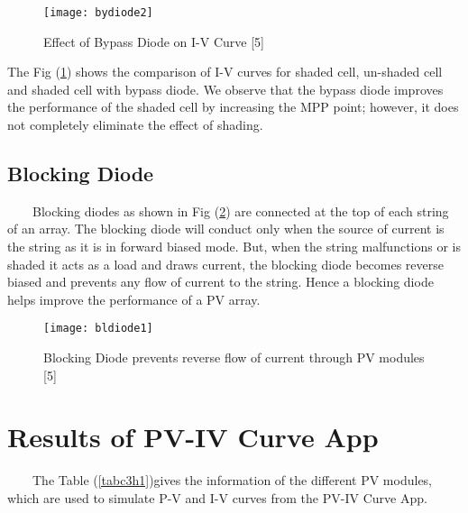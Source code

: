 \begin{figure}[H]
\centering
\texttt{[image: bydiode2]}
\caption{Effect of Bypass Diode on I-V Curve [5]}
\label{figc3h190} %
\end{figure}

The Fig (\ref{figc3h190}) shows the comparison of I-V curves for shaded cell, un-shaded cell and shaded cell with bypass diode. We observe that the bypass diode improves the performance of the shaded cell by increasing the MPP point; however, it does not completely eliminate the effect of shading.

\subsection{Blocking Diode}
\
\
\
\
Blocking diodes as shown in Fig (\ref{figc3h200}) are connected at the top of each string of an array. The blocking diode will conduct only when the source of current is the string as it is in forward biased mode. But, when the string malfunctions or is shaded it acts as a load and draws current, the blocking diode becomes reverse biased and prevents any flow of current to the string. Hence a blocking diode helps improve the performance of a PV array.

\begin{figure}[H]
\centering
\texttt{[image: bldiode1]}
\caption{Blocking Diode prevents reverse flow of current through PV modules [5]}
\label{figc3h200} %
\end{figure}

\newpage

\section{Results of PV-IV Curve App}
\
\
\
\
The Table (\ref{tabc3h1})gives the information of the different PV modules, which are used to simulate P-V and I-V curves from the PV-IV Curve App.


